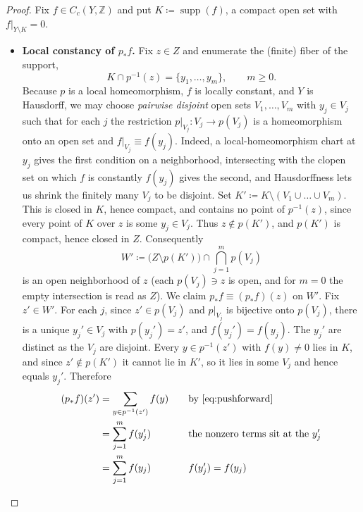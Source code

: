 \documentclass[10pt,a4paper]{amsart}
\newcommand{\Z}{\mathbb{Z}}
\newcommand{\restr}[2]{#1\rvert_{#2}}
\newcommand{\step}[1]{\textbf{#1}}
\DeclareMathOperator{\supp}{supp}
\begin{document}
\begin{proof}
Fix \(f\in C_c(Y,\Z)\) and put \(K\coloneqq\supp(f)\), a compact open set with \(\restr{f}{Y\setminus K}=0\).
\begin{itemize}
\item \step{Local constancy of \(p_*f\).}
Fix \(z\in Z\) and enumerate the (finite) fiber of the support,
\begin{equation}\label{eq:fiber-enum}
K\cap p^{-1}(z)=\{y_1,\dots,y_m\},\qquad m\ge 0.
\end{equation}
Because \(p\) is a local homeomorphism, \(f\) is locally constant, and \(Y\) is Hausdorff, we may choose \emph{pairwise disjoint} open sets \(V_1,\dots,V_m\) with \(y_j\in V_j\) such that for each \(j\) the restriction \(\restr{p}{V_j}\colon V_j\to p(V_j)\) is a homeomorphism onto an open set and \(\restr{f}{V_j}\equiv f(y_j)\).
Indeed, a local-homeomorphism chart at \(y_j\) gives the first condition on a neighborhood, intersecting with the clopen set on which \(f\) is constantly \(f(y_j)\) gives the second, and Hausdorffness lets us shrink the finitely many \(V_j\) to be disjoint.
Set \(K'\coloneqq K\setminus(V_1\cup\dots\cup V_m)\).
This is closed in \(K\), hence compact, and contains no point of \(p^{-1}(z)\), since every point of \(K\) over \(z\) is some \(y_j\in V_j\).
Thus \(z\notin p(K')\), and \(p(K')\) is compact, hence closed in \(Z\).
Consequently
\begin{equation}\label{eq:Wprime}
W'\coloneqq\bigl(Z\setminus p(K')\bigr)\cap\bigcap_{j=1}^m p(V_j)
\end{equation}
is an open neighborhood of \(z\) (each \(p(V_j)\ni z\) is open, and for \(m=0\) the empty intersection is read as \(Z\)).
We claim \(p_*f\equiv(p_*f)(z)\) on \(W'\).
Fix \(z'\in W'\).
For each \(j\), since \(z'\in p(V_j)\) and \(\restr{p}{V_j}\) is bijective onto \(p(V_j)\), there is a unique \(y_j'\in V_j\) with \(p(y_j')=z'\), and \(f(y_j')=f(y_j)\).
The \(y_j'\) are distinct as the \(V_j\) are disjoint.
Every \(y\in p^{-1}(z')\) with \(f(y)\neq0\) lies in \(K\), and since \(z'\notin p(K')\) it cannot lie in \(K'\), so it lies in some \(V_j\) and hence equals \(y_j'\).
Therefore
\begin{equation}\label{eq:pf-locally-constant}
\begin{aligned}
(p_*f)(z')
&=\sum_{y\in p^{-1}(z')}f(y)&&\quad\text{by \eqref{eq:pushforward}}\\
&=\sum_{j=1}^m f(y_j')&&\quad\text{the nonzero terms sit at the \(y_j'\)}\\
&=\sum_{j=1}^m f(y_j)&&\quad\text{\(f(y_j')=f(y_j)\)}\\

\end{aligned}
\end{equation}
\end{itemize}
\end{proof}
\end{document}
